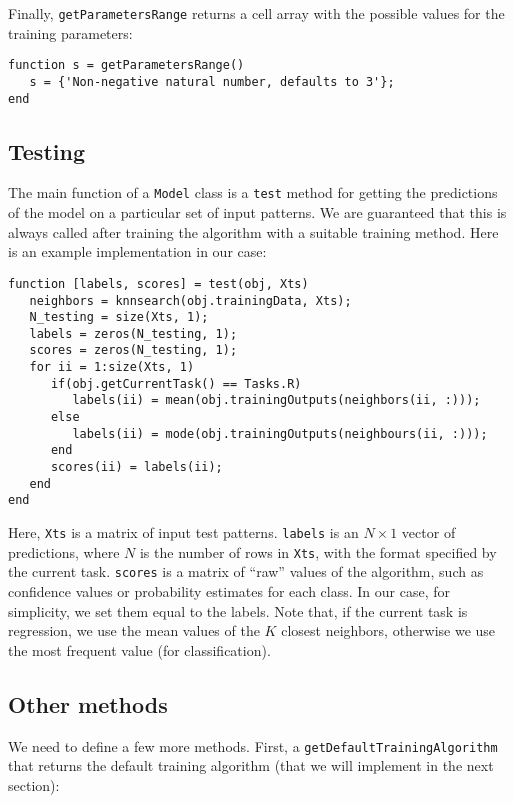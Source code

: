 \noindent Finally, \verb|getParametersRange| returns a cell array with the possible values for the training parameters:

\begin{lstlisting}
function s = getParametersRange()
   s = {'Non-negative natural number, defaults to 3'};
end
\end{lstlisting}

\subsection{Testing}

The main function of a \verb|Model| class is a \verb|test| method for getting the predictions of the model on a particular set of input patterns. We are guaranteed that this is always called after training the algorithm with a suitable training method. Here is an example implementation in our case:

\begin{lstlisting}
function [labels, scores] = test(obj, Xts)
   neighbors = knnsearch(obj.trainingData, Xts);
   N_testing = size(Xts, 1);
   labels = zeros(N_testing, 1);
   scores = zeros(N_testing, 1);
   for ii = 1:size(Xts, 1)
      if(obj.getCurrentTask() == Tasks.R)
         labels(ii) = mean(obj.trainingOutputs(neighbors(ii, :)));
      else
         labels(ii) = mode(obj.trainingOutputs(neighbours(ii, :)));
      end
      scores(ii) = labels(ii);
   end
end
\end{lstlisting}

Here, \verb|Xts| is a matrix of input test patterns. \verb|labels| is an $N \times 1$ vector of predictions, where $N$ is the number of rows in \verb|Xts|, with the format specified by the current task. \verb|scores| is a matrix of ``raw'' values of the algorithm, such as confidence values or probability estimates for each class. In our case, for simplicity, we set them equal to the labels. Note that, if the current task is regression, we use the mean values of the $K$ closest neighbors, otherwise we use the most frequent value (for classification).

\subsection{Other methods}

We need to define a few more methods. First, a \verb|getDefaultTrainingAlgorithm| that returns the default training algorithm (that we will implement in the next section):

